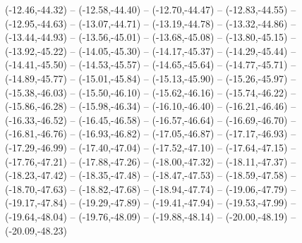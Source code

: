 {  (-12.46,-44.32) -- (-12.58,-44.40) -- (-12.70,-44.47) -- (-12.83,-44.55) -- (-12.95,-44.63) -- (-13.07,-44.71) -- (-13.19,-44.78) --
  (-13.32,-44.86) -- (-13.44,-44.93) -- (-13.56,-45.01) -- (-13.68,-45.08) -- (-13.80,-45.15) -- (-13.92,-45.22) -- (-14.05,-45.30) --
  (-14.17,-45.37) -- (-14.29,-45.44) -- (-14.41,-45.50) -- (-14.53,-45.57) -- (-14.65,-45.64) -- (-14.77,-45.71) -- (-14.89,-45.77) --
  (-15.01,-45.84) -- (-15.13,-45.90) -- (-15.26,-45.97) -- (-15.38,-46.03) -- (-15.50,-46.10) -- (-15.62,-46.16) -- (-15.74,-46.22) --
  (-15.86,-46.28) -- (-15.98,-46.34) -- (-16.10,-46.40) -- (-16.21,-46.46) -- (-16.33,-46.52) -- (-16.45,-46.58) -- (-16.57,-46.64) --
  (-16.69,-46.70) -- (-16.81,-46.76) -- (-16.93,-46.82) -- (-17.05,-46.87) -- (-17.17,-46.93) -- (-17.29,-46.99) -- (-17.40,-47.04) --
  (-17.52,-47.10) -- (-17.64,-47.15) -- (-17.76,-47.21) -- (-17.88,-47.26) -- (-18.00,-47.32) -- (-18.11,-47.37) -- (-18.23,-47.42) --
  (-18.35,-47.48) -- (-18.47,-47.53) -- (-18.59,-47.58) -- (-18.70,-47.63) -- (-18.82,-47.68) -- (-18.94,-47.74) -- (-19.06,-47.79) --
  (-19.17,-47.84) -- (-19.29,-47.89) -- (-19.41,-47.94) -- (-19.53,-47.99) -- (-19.64,-48.04) -- (-19.76,-48.09) -- (-19.88,-48.14) --
  (-20.00,-48.19) -- (-20.09,-48.23)}
